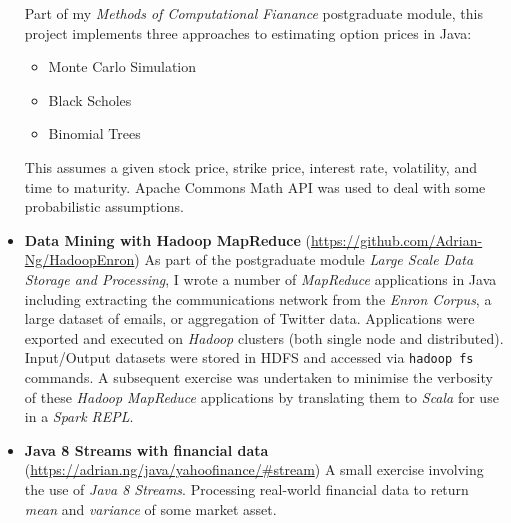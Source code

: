 \documentclass[letterpaper,11pt]{article}
\newcommand{\resumeItem}[3]{
	\item\small{
		\textbf{#1}\hfill\tiny{#2\\}\small{ #3 \vspace{-2pt}}
	}
}
\newcommand{\resumeSubItem}[3]{\resumeItem{#1}{#2}{#3}\vspace{-2pt}}
\begin{document}
\begin{itemize}
{	      \newline
	      \small
	      Part of my \textit{Methods of Computational Fianance} postgraduate module, this project implements three approaches to estimating option prices in Java:
	      \begin{itemize}
		      \item Monte Carlo Simulation
		      \item Black Scholes
		      \item Binomial Trees
	      \end{itemize}
	      This assumes a given stock price, strike price, interest rate, volatility, and time to maturity.
	      Apache Commons Math API was used to deal with some probabilistic assumptions.
	      }
	\item
	      {
	      \textbf{Data Mining with Hadoop MapReduce}
	      \hfill
	      \tiny
	      (\href{https://github.com/Adrian-Ng/HadoopEnron}{https://github.com/Adrian-Ng/HadoopEnron})
	      \small
	      \newline
	      As part of the postgraduate module \textit{Large Scale Data Storage and Processing}, I wrote a number of \textit{MapReduce} applications in Java including extracting the communications network from the \textit{Enron Corpus}, a large dataset of emails, or aggregation of Twitter data.
	      \newline
	      Applications were exported and executed on \textit{Hadoop} clusters (both single node and distributed). Input/Output datasets were stored in HDFS and accessed via \texttt{hadoop fs} commands.
	      \newline
	      A subsequent exercise was undertaken to minimise the verbosity of these \textit{Hadoop MapReduce} applications by translating them to \textit{Scala} for use in a \textit{Spark REPL}.
	      }
	\item {
	      \textbf{Java 8 Streams with financial data}
	      \hfill
	      \tiny
	      (\href{https://adrian.ng/java/yahoofinance/\#stream}{https://adrian.ng/java/yahoofinance/\#stream})
	      \small
	      \newline
	      A small exercise involving the use of \textit{Java 8 Streams}. Processing real-world financial data to return \textit{mean} and \textit{variance} of some market asset.
	      }
\end{itemize}
\end{document}
